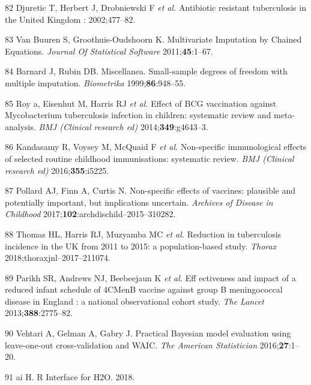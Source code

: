 \documentclass[11pt,twoside]{bristolthesis}
\begin{document}
  \leavevmode\hypertarget{ref-Djuretic2002}{}%
  82 Djuretic T, Herbert J, Drobniewski F \emph{et al.} Antibiotic resistant tuberculosis in the United Kingdom : 2002;477--82.
  
  \leavevmode\hypertarget{ref-VanBuuren2011}{}%
  83 Van Buuren S, Groothuis-Oudshoorn K. Multivariate Imputation by Chained Equations. \emph{Journal Of Statistical Software} 2011;\textbf{45}:1--67.
  
  \leavevmode\hypertarget{ref-Barnard1999}{}%
  84 Barnard J, Rubin DB. Miscellanea. Small-sample degrees of freedom with multiple imputation. \emph{Biometrika} 1999;\textbf{86}:948--55.
  
  \leavevmode\hypertarget{ref-Roy2014b}{}%
  85 Roy a, Eisenhut M, Harris RJ \emph{et al.} Effect of BCG vaccination against Mycobacterium tuberculosis infection in children: systematic review and meta-analysis. \emph{BMJ (Clinical research ed)} 2014;\textbf{349}:g4643--3.
  
  \leavevmode\hypertarget{ref-Kandasamy2016}{}%
  86 Kandasamy R, Voysey M, McQuaid F \emph{et al.} Non-specific immunological effects of selected routine childhood immunisations: systematic review. \emph{BMJ (Clinical research ed)} 2016;\textbf{355}:i5225.
  
  \leavevmode\hypertarget{ref-Pollard2017}{}%
  87 Pollard AJ, Finn A, Curtis N. Non-specific effects of vaccines: plausible and potentially important, but implications uncertain. \emph{Archives of Disease in Childhood} 2017;\textbf{102}:archdischild--2015--310282.
  
  \leavevmode\hypertarget{ref-Thomas2018}{}%
  88 Thomas HL, Harris RJ, Muzyamba MC \emph{et al.} Reduction in tuberculosis incidence in the UK from 2011 to 2015: a population-based study. \emph{Thorax} 2018;thoraxjnl--2017--211074.
  
  \leavevmode\hypertarget{ref-Parikh2016a}{}%
  89 Parikh SR, Andrews NJ, Beebeejaun K \emph{et al.} Eff ectiveness and impact of a reduced infant schedule of 4CMenB vaccine against group B meningococcal disease in England : a national observational cohort study. \emph{The Lancet} 2013;\textbf{388}:2775--82.
  
  \leavevmode\hypertarget{ref-Vehtari2016}{}%
  90 Vehtari A, Gelman A, Gabry J. Practical Bayesian model evaluation using leave-one-out cross-validation and WAIC. \emph{The American Statistician} 2016;\textbf{27}:1--20.
  
  \leavevmode\hypertarget{ref-h2o2018}{}%
  91 ai H. R Interface for H2O. 2018.
  
\end{document}
